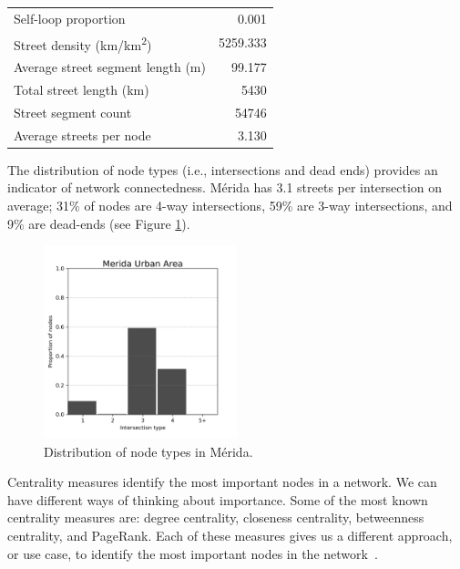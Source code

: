 \begin{table}[htbp]
\begin{tabular}{ l r }
    Self-loop proportion                             & 0.001        \\
    Street density (km/km\textsuperscript{2})        & 5259.333        \\
    Average street segment length (m)                & 99.177        \\
    Total street length (km)                         & 5430     \\
    Street segment count                             & 54746      \\
    Average streets per node                         & 3.130         \\
    \bottomrule
  \end{tabular}
\end{table}

The distribution of node types (i.e., intersections and dead ends) provides an indicator of network connectedness.
Mérida has 3.1 streets per intersection on average; 31\% of nodes are 4-way intersections, 59\% are 3-way intersections, and 9\% are dead-ends (see Figure \ref{fig:merida-node-types-distribution}).

\begin{figure}[htpb]
  \centering
  \includegraphics[width=0.5\textwidth]{Figures/merida-street-per-node-proportion-distribution.png}
  \caption{Distribution of node types in Mérida.
    \label{fig:merida-node-types-distribution}}
\end{figure}

Centrality measures identify the most important nodes in a network.
We can have different ways of thinking about importance.
Some of the most known centrality measures are: degree centrality, closeness centrality, betweenness centrality, and PageRank.
Each of these measures gives us a different approach, or use case, to identify the most important nodes in the network~\cite{menczer_fortunato_davis_2020}.

